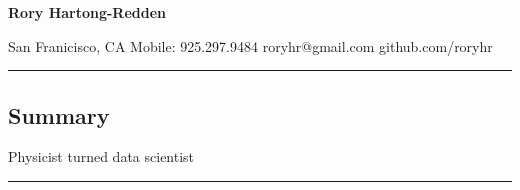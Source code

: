 \documentclass[10pt,letterpaper]{article}
\begin{document}
{\raggedright 
\LARGE{\bf Rory Hartong-Redden}\\}

{\raggedleft 
San Franicisco, CA \textbar\/ Mobile: 925.297.9484 \textbar\/ roryhr@gmail.com \textbar\/   github.com/roryhr\\}
\hrule


\vspace{-0.4em}
\subsection*{Summary}

\begin{centering}  
Physicist turned data scientist\\
\end{centering}

\vspace{0.4em}
	

\hrule
\vspace{-0.4em}
\end{document}
